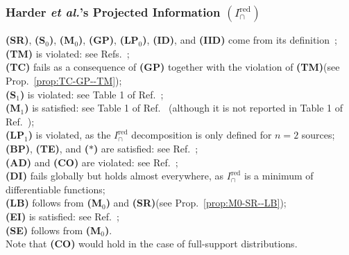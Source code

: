 \documentclass{article}
\makeatletter
\newcommand{\etalx}{\textit{et al.\@}\xspace}
\newcommand{\ts}[1]{\ensuremath{_{\text{#1}}}}
\newcommand{\SR}{\textbf{(SR)}\xspace} %
\newcommand{\Sz}{\textbf{(S\ts{0})}\xspace} %
\newcommand{\Mz}{\textbf{(M\ts{0})}\xspace} %
\newcommand{\GP}{\textbf{(GP)}\xspace} %
\newcommand{\LPz}{\textbf{(LP\ts{0})}\xspace} %
\newcommand{\ID}{\textbf{(ID)}\xspace} %
\newcommand{\IID}{\textbf{(IID)}\xspace} %
\newcommand{\TM}{\textbf{(TM)}\xspace} %
\newcommand{\TC}{\textbf{(TC)}\xspace} %
\newcommand{\So}{\textbf{(S\ts{1})}\xspace} %
\newcommand{\Mo}{\textbf{(M\ts{1})}\xspace} %
\newcommand{\LPo}{\textbf{(LP\ts{1})}\xspace} %
\newcommand{\BP}{\textbf{(BP)}\xspace} %
\newcommand{\TE}{\textbf{(TE)}\xspace} %
\newcommand{\AST}{\textbf{($\boldsymbol{\ast}$)}\xspace} %
\newcommand{\AD}{\textbf{(AD)}\xspace} %
\newcommand{\CO}{\textbf{(CO)}\xspace} %
\newcommand{\LB}{\textbf{(LB)}\xspace} %
\newcommand{\EI}{\textbf{(EI)}\xspace} %
\newcommand{\SE}{\textbf{(SE)}\xspace} %
\newcommand{\DI}{\textbf{(DI)}\xspace}
\newcommand{\Ired}{\ensuremath{I^{\text{red}}_\cap}\xspace}
\makeatother
\begin{document}
\subsubsection*{Harder \etalx's Projected Information $(\Ired)$}
    \SR, \Sz, \Mz, \GP, \LPz, \ID, and \IID come from its definition~\cite{harder2013bivariate}; \\
    \TM is violated: see Refs.~\cite{bertschinger2013shared, banerjee2015synergy}; \\
    \TC fails as a consequence of \GP together with the violation of \TM (see Prop.~\ref{prop:TC-GP--TM}); \\
    \So is violated: see Table 1 of Ref.~\cite{griffith2014intersection}; \\
    \Mo is satisfied: see Table 1 of Ref.~\cite{banerjee2015synergy} (although it is not reported in Table 1 of Ref.~\cite{griffith2014intersection}); \\
    \LPo is violated, as the $\Ired$ decomposition is only defined for $n=2$ sources; \\
    \BP, \TE, and \AST are satisfied: see Ref.~\cite{kolchinsky2022novel}; \\
    \AD and \CO are violated: see Ref.~\cite{rauh2023continuity}; \\
    \DI fails globally but holds almost everywhere, as \Ired is a minimum of differentiable functions; \\  
    \LB follows from \Mz and \SR (see Prop.~\ref{prop:M0-SR--LB}); \\
    \EI is satisfied: see Ref.~\cite{griffith2014intersection}; \\
    \SE follows from \Mz. \\
    Note that \CO would hold in the case of full-support distributions.
    
\end{document}
